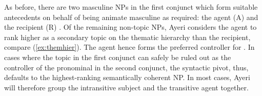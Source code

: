 \begin{figure}
\begin{morphlex}
\pex\label{ex:animgendclash}
\a {}

\a{}
\xe
\end{morphlex}
\end{figure}

As before, there are two masculine NPs in the first conjunct which form
suitable antecedents on behalf of being animate masculine as required: the
agent (A)  and the recipient (R) . Of the
remaining non-topic NPs, Ayeri considers the agent to rank higher as a
secondary topic on the thematic hierarchy than the recipient, compare 
(\ref{ex:themhier}). The agent hence forms the preferred controller for
. In cases where the topic in the first conjunct can
safely be ruled out as the controller of the pronominal in the second conjunct,
the syntactic pivot, thus, defaults to the highest-ranking semantically
coherent NP. In most cases, Ayeri will therefore group the intransitive subject
and the transitive agent together.

